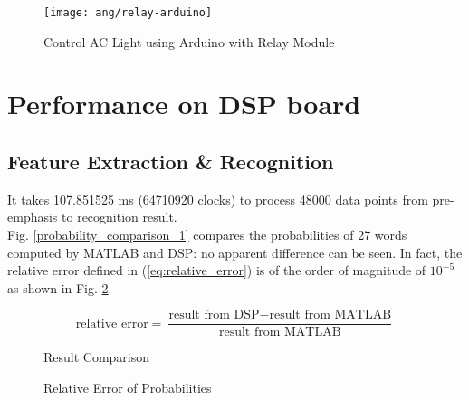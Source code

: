 \begin{figure}[H]
\centering
\texttt{[image: ang/relay-arduino]}
\caption{Control AC Light using Arduino with Relay Module \cite{relay-arduino}}
\label{relay-arduino}
\end{figure}


\section{Performance on DSP board}

\subsection{Feature Extraction \& Recognition}

It takes 107.851525 ms (64710920 clocks) to process 48000 data points from pre-emphasis to recognition result.\\

Fig. \ref{probability_comparison_1} compares the probabilities of 27 words computed by MATLAB and DSP: no apparent difference can be seen. In fact, the relative error defined in (\ref{eq:relative_error}) is of the order of magnitude of $10^{-5}$ as shown in Fig. \ref{probability_error_1}.

\begin{equation}
\label{eq:relative_error}
\text{relative error} = \frac{\text{result from DSP} - \text{result from MATLAB}}{\text{result from MATLAB}}
\end{equation}

\begin{figure}[H]
\begin{minipage}[t]{0.5\linewidth}
\centering
{}
\caption{Result Comparison}
\label{probability_comparison_1}
\end{minipage}
\begin{minipage}[t]{0.5\linewidth}
\centering
{}
\caption{Relative Error of Probabilities}
\label{probability_error_1}
\end{minipage}
\end{figure}

